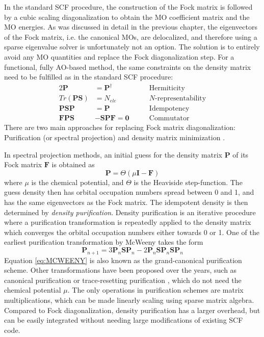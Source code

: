 In the standard SCF procedure, the construction of the Fock matrix is followed by a cubic scaling diagonalization to obtain the MO coefficient matrix and the MO energies. As was discussed in detail in the previous chapter, the eigenvectors of the Fock matrix, i.e. the canonical MOs, are delocalized, and therefore using a sparse eigenvalue solver is unfortunately not an option. The solution is to entirely avoid any MO quantities and replace the Fock diagonalization step. For a functional, fully AO-based method, the same constraints on the density matrix need to be fulfilled as in the standard SCF procedure:
\begin{alignat}{2}
\mathbf{P} &= \mathbf{P}^{\dagger} \qquad &\textrm{Hermiticity}
\\
Tr(\mathbf{PS}) &= N_{ele} \qquad &\textrm{$N$-representability}
\\
\mathbf{PSP} &= \mathbf{P} \qquad &\textrm{Idempotency}
\\
\mathbf{FPS} &- \mathbf{SPF} = \mathbf{0} \qquad &\textrm{Commutator}
\end{alignat}
\noindent There are two main approaches for replacing Fock matrix diagonalization: Purification (or spectral projection) and density matrix minimization \cite{Kim2016}. %

In spectral projection methods, an initial guess for the density matrix $\mathbf{P}$ of its Fock matrix $\mathbf{F}$ is obtained as
\begin{equation}
\mathbf{P} = \Theta \left( \mu \mathbf{I} - \mathbf{F} \right)
\end{equation}
\noindent where $\mu$ is the chemical potential, and $\Theta$ is the Heaviside step-function. The guess density then has orbital occupation numbers spread between 0 and 1, and has the same eigenvectors as the Fock matrix. The idempotent density is then determined by \emph{density purification}. Density purification is an iterative procedure where a purification transformation is repeatedly applied to the density matrix which converges the orbital occupation numbers either towards 0 or 1. One of the earliest purification transformation by McWeeny \cite{McW1959} takes the form
\begin{equation}
\mathbf{P}_{n+1} = 3\mathbf{P}_n\mathbf{SP}_n - 2\mathbf{P}_n\mathbf{SP}_n\mathbf{SP}_n
\label{eq:MCWEENY}
\end{equation}
\noindent Equation \ref{eq:MCWEENY} is also known as the grand-canonical purification scheme. Other transformations have been proposed over the years, such as canonical purification \cite{Pal1998} or trace-resetting purification \cite{Nik2003}, which do not need the chemical potential $\mu$. The only operations in purification schemes are matrix multiplications, which can be made linearly scaling using sparse matrix algebra. Compared to Fock diagonalization, density purification has a larger overhead, but can be easily integrated without needing large modifications of existing SCF code.

